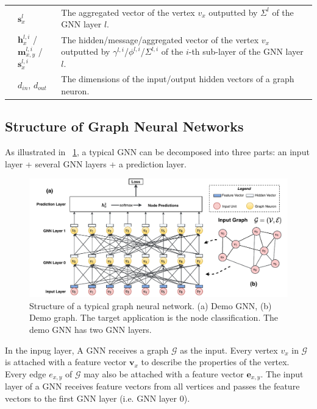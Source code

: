 \begin{table}[h]
\begin{tabular}{p{3em}lp{35em}}
        & $\boldsymbol{s}_{x}^l$ & The aggregated vector of the vertex $v_x$ outputted by $\Sigma^l$ of the GNN layer $l$. \\
        & $\boldsymbol{h}_{x}^{l,i}$ / $\boldsymbol{m}_{x,y}^{l,i}$ / $\boldsymbol{s}_{x}^{l,i}$ & The hidden/message/aggregated vector of the vertex $v_x$ outputted by $\gamma^{l,i}$/$\phi^{l,i}$/$\Sigma^{l,i}$ of the $i$-th sub-layer of the GNN layer $l$. \\
        & $d_{in}$, $d_{out}$ &  The dimensions of the input/output hidden vectors of a graph neuron. \\
        \bottomrule
        
    \end{tabular}
\end{table}

\subsection{Structure of Graph Neural Networks}

As illustrated in \figurename~\ref{fig:general_structure_of_gnn}, a typical GNN can be decomposed into three parts: an input layer + several GNN layers + a prediction layer.

\begin{figure}[h]
    \centering
    \includegraphics[width=0.95\columnwidth]{figs/illustration/GNN_common_architecture.pdf}
    \caption{Structure of a typical graph neural network. (a) Demo GNN, (b) Demo graph. The target application is the node classification. The demo GNN has two GNN layers.}
    \label{fig:general_structure_of_gnn}
\end{figure}

In the inpug layer, A GNN receives a graph $\mathcal{G}$ as the input.
%
Every vertex $v_x$ in $\mathcal{G}$ is attached with a feature vector $\boldsymbol{v}_x$ to describe the properties of the vertex.
%
Every edge $e_{x,y}$ of $\mathcal{G}$ may also be attached with a feature vector $\boldsymbol{e}_{x,y}$.
%
The input layer of a GNN receives feature vectors from all vertices and passes the feature vectors to the first GNN layer (i.e. GNN layer 0).

